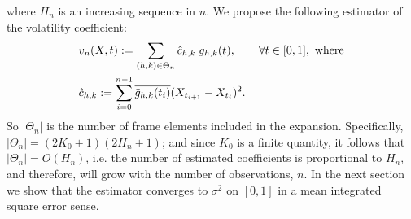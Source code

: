 where $H_n$ is an increasing sequence in $n$.    
We propose the following estimator of the volatility coefficient:
\begin{align}
  \label{eq:contvolestimator}
  &v_n(X, t) := \sum_{(h,k) \in \Theta_n} \hat{c}_{h,k}\;g_{h,k}(t), \qquad \forall t \in [0,1], \text{ where}\\
  &\hat{c}_{h,k} := \sum_{i =0}^{n-1} \overline{\tilde{g}_{h,k}(t_i)} (X_{t_{i+1}} - X_{t_i})^2.
\end{align}
So $\vert \Theta_n \vert $ is the number of frame elements included in the expansion. Specifically,   $\vert \Theta_n\vert = (2K_0 + 1)(2H_n+1)$; and since $K_0$ is a finite quantity, it follows that $\vert\Theta_n\vert = O(H_n)$, i.e. the number of estimated coefficients is proportional to $H_n$, and therefore, will grow with the number of observations, $n$. 
In the next section we show that the estimator converges to $\sigma^2$ on $[0,1]$ in a mean integrated square error sense.

